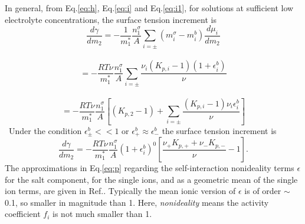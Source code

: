 In general, from Eq.\thinspace\ref{eq:h}, Eq.\thinspace\ref{eq:i} and Eq.\thinspace\ref{eq:i1}, for solutions at sufficient low electrolyte concentrations, the surface tension increment is 
\begin{equation}
\frac{d\gamma}{dm_2} = -\frac{1}{m_1^*}\frac{n_1^{\sigma}}{A}\sum_{i=\pm}(m_i^{\sigma} -m_{i}^{b})\frac{d\mu_i}{dm_2} \nonumber
\label{eq:gamma_m2}
\end{equation}\
\begin{equation}
= -\frac{RT\nu}{m_1^*}\frac{n_1^{\sigma}}{A}\sum_{i=\pm} \frac{{\nu_i}(K_{p,i}-1)(1+\epsilon_i^b)}{\nu} \nonumber
\label{eq:l}
\end{equation}\
\begin{equation}
= -\frac{RT\nu}{m_1^*}\frac{n_1^{\sigma}}{A}[(K_{p,2}-1)+\sum_{i=\pm} \frac{(K_{p,i}-1)\nu_i\epsilon_i^b}{\nu}]
\label{eq:n}
\end{equation}\
Under the condition $\epsilon_{\pm}^b << 1$ or $\epsilon_{+}^b \approx \epsilon_{-}^b$
the surface tension increment is 
\begin{equation}
\frac{d\gamma}{dm_2} 
= -\frac{RT\nu}{m_1^*}\frac{n_1^{\sigma}}{A} (1+\epsilon_i^b)^0 [\frac{\nu_+ K_{p,+} + \nu_- K_{p,-}}{\nu}-1].
\label{eq:p}
\end{equation}
The approximations in Eq.\thinspace\ref{eq:p} regarding the self-interaction {nonideality terms} $\epsilon$ for the salt component, 
for the single ions, and as a geometric mean of the single ion terms, are given in Ref.\cite{Pegram2006}.  
Typically the mean ionic version of $\epsilon$ is of order $\sim$ 0.1, so smaller in magnitude than 1. %
Here, \emph{nonideality} means the activity coefficient $f_i$ is not much smaller than 1.
%
%
%
%


